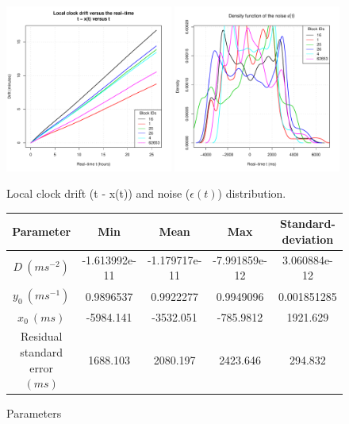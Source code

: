 \documentclass[11pt]{article}
\begin{document}
\begin{figure}[h!]
\centering
\includegraphics[width=0.49\textwidth]{pictures/drift.pdf}
\includegraphics[width=0.49\textwidth]{pictures/noise.pdf}
\caption{Local clock drift (t - x(t)) and noise ($\epsilon(t)$) distribution.}
\label{fig:drift-noise}
\end{figure}

\begin{figure}[h!]
\scriptsize
\begin{center}
\begin{tabular}{|c|c|c|c|c|} 
\hline
Parameter & Min & Mean & Max & Standard-deviation \\
\hline
$D\ (ms^{-2})$ & -1.613992e-11 & -1.179717e-11 & -7.991859e-12 & 3.060884e-12 \\
\hline
$y_0\ (ms^{-1})$ & 0.9896537 & 0.9922277 & 0.9949096 & 0.001851285\\
\hline
$x_0\ (ms)$ & -5984.141 & -3532.051 & -785.9812 & 1921.629\\
\hline
Residual standard error $(ms)$ & 1688.103 &  2080.197  & 2423.646 & 294.832\\
\hline
\end{tabular}
\end{center}
\caption{Parameters}
\end{figure}
\end{document}
